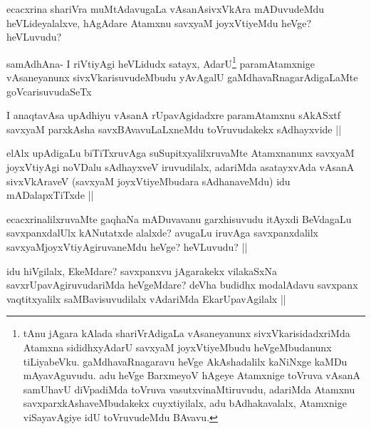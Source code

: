
\begin{artha}
ecacxrina shariVra muMtAdavugaLa vAsanAsivxVkAra mADuvudeMdu heVLideyalalxve, hAgAdare Atamxnu savxyaM joyxVtiyeMdu heVge? heVLuvudu?
\end{artha}

\begin{artha}
samAdhAna- I riVtiyAgi heVLidudx satayx, AdarU\footnote{tAnu jAgara kAlada shariVrAdigaLa vAsaneyanunx sivxVkarisidadxriMda Atamxna sididhxyAdarU savxyaM joyxVtiyeMbudu heVgeMbudanunx tiLiyabeVku. gaMdhavaRnagaravu heVge AkAshadalilx kaNiNxge kaMDu mAyavAguvudu. adu heVge BarxmeyoV hAgeye Atamxnige toVruva vAsanA samUhavU diVpadiMda toVruva vasutxvinaMtiruvudu, adariMda Atamxnu savxparxkAshaveMbudakekx cuyxtiyilalx, adu bAdhakavalalx, Atamxnige viSayavAgiye idU toVruvudeMdu BAvavu.} paramAtamxnige vAsaneyanunx sivxVkarisuvudeMbudu yAvAgalU gaMdhavaRnagarAdigaLaMte goVcarisuvudaSeTx
\end{artha}


\begin{artha}
I anaqtavAsa upAdhiyu vAsanA rUpavAgidadxre paramAtamxnu sAkASxtf savxyaM parxkAsha savxBAvavuLaLxneMdu toVruvudakekx sAdhayxvide ||
\end{artha}


\begin{artha}
elAlx upAdigaLu biTiTxruvAga suSupitxyalilxruvaMte Atamxnanunx savxyaM joyxVtiyAgi noVDalu sAdhayxveV iruvudilalx, adariMda asatayxvAda vAsanA sivxVkAraveV (savxyaM joyxVtiyeMbudara sAdhanaveMdu) idu mADalapxTiTxde ||
\end{artha}


\begin{artha}
ecacxrinalilxruvaMte gaqhaNa mADuvavanu garxhisuvudu itAyxdi BeVdagaLu savxpanxdalUlx kANutatxde alalxde? avugaLu iruvAga savxpanxdalilx savxyaMjoyxVtiyAgiruvaneMdu heVge? heVLuvudu? ||
\end{artha}


\begin{artha}
idu hiVgilalx, EkeMdare? savxpanxvu jAgarakekx vilakaSxNa savxrUpavAgiruvudariMda heVgeMdare? deVha budidhx modalAdavu savxpanx vaqtitxyalilx saMBavisuvudilalx vAdariMda EkarUpavAgilalx ||
\end{artha}

